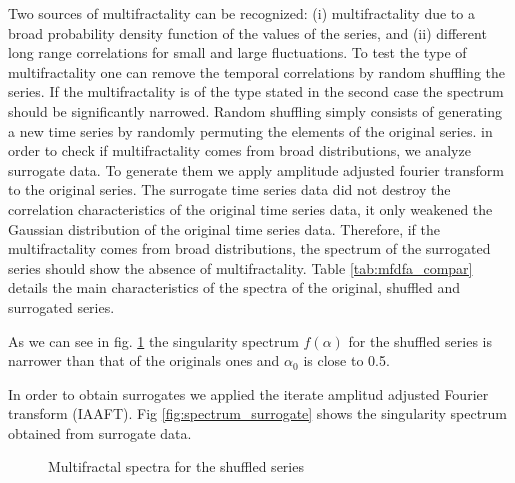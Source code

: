\documentclass[onecolumn, preprint,aps,amsmath, amssymb, superscriptaddress]{revtex4}
\begin{document}
Two sources of multifractality can be recognized: (i) multifractality due to a broad probability density function of the values of the series, and (ii) different long range correlations for small and large fluctuations. To test the type of multifractality one can remove the temporal correlations by random shuffling the series. If the multifractality is of the type stated in the second case the spectrum should be significantly narrowed. Random shuffling simply consists of generating a new time series by randomly permuting the elements of the original series. in order to check if multifractality comes from broad distributions, we analyze surrogate data. To generate them we apply amplitude adjusted fourier transform to the original series. The surrogate time series data did not destroy the correlation characteristics of the original time series data, it only weakened the Gaussian distribution of the original time series data. Therefore, if the multifractality comes from broad distributions, the spectrum of the surrogated series should show the absence of multifractality. Table \ref{tab:mfdfa_compar} details the main characteristics of the spectra of the original, shuffled and surrogated series.

As we can see in fig. \ref{fig:spectrum_shuffle} the singularity spectrum $f(\alpha)$ for the shuffled series is narrower than that of the originals ones and $\alpha_0$ is close to 0.5. 

In order to obtain surrogates we applied the iterate amplitud adjusted Fourier transform (IAAFT). Fig \ref{fig:spectrum_surrogate} shows the singularity spectrum obtained from surrogate data. 


\begin{figure}
\caption{Multifractal spectra for the shuffled series}
\label{fig:spectrum_shuffle}
\end{figure}
\end{document}
